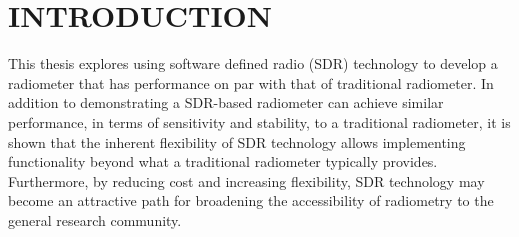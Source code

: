 \chapter{INTRODUCTION}\label{ch:intro}




This thesis explores using software defined radio (SDR) technology to develop a radiometer that has performance on par with that of traditional radiometer.  In addition to demonstrating a SDR-based radiometer can achieve similar performance, in terms of sensitivity and stability, to a traditional radiometer, it is shown that the inherent flexibility of SDR technology allows implementing functionality beyond what a traditional radiometer typically provides.  Furthermore, by reducing cost and increasing flexibility, SDR technology may become an attractive path for broadening the accessibility of radiometry to the general research community.



